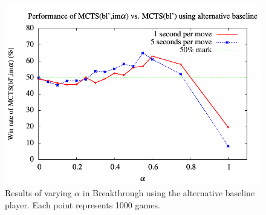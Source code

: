 \documentclass{article}
\begin{document}
\begin{figure}[t!]
\begin{center}
\includegraphics[scale=0.68]{plots/bt-alt-alpha}
\caption{Results of varying $\alpha$ in Breakthrough using the alternative baseline player.
Each point represents 1000 games.} 
\label{fig:bt-alt-alpha}
\end{center}
\end{figure}


\vspace{0.1cm}

%
\end{document}
